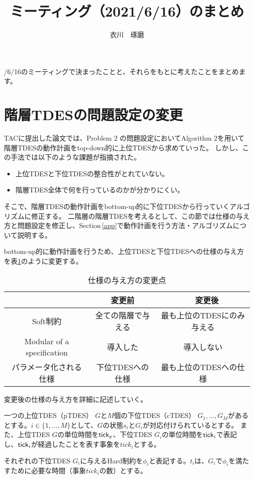 \documentclass[ 10pt]{jsarticle}
\title{ミーティング（2021/6/16）のまとめ}
\author{衣川　琢磨}
\newcommand{\rsec}[1]{Section\,\ref{#1}}
\newcommand{\tick}{{\sf tick}}
\begin{document}
/6/16のミーティングで決まったことと、それらをもとに考えたことをまとめます。

\section{階層TDESの問題設定の変更}
TACに提出した論文では、Problem 2 の問題設定においてAlgorithm 2を用いて階層TDESの動作計画をtop-down的に上位TDESから求めていった。
しかし、この手法では以下のような課題が指摘された。
\begin{itemize}
\item
上位TDESと下位TDESの整合性がとれていない。
\item
階層TDES全体で何を行っているのかが分かりにくい。
\end{itemize}
そこで、階層TDESの動作計画をbottom-up的に下位TDESから行っていくアルゴリズムに修正する。
二階層の階層TDESを考えるとして、この節では仕様の与え方と問題設定を修正し、\rsec{app}で動作計画を行う方法・アルゴリズムについて説明する。

bottom-up的に動作計画を行うため、上位TDESと下位TDESへの仕様の与え方を表\ref{spec}のように変更する。
%
\begin{table}[htb]
\centering
\caption{仕様の与え方の変更点}
\label{spec}
\begin{tabular}{c||c|c}
 &変更前　&　変更後　\\\hline\hline
Soft制約&全ての階層で与える&最も上位のTDESにのみ与える\\\hline
Modular of a specification&導入した&導入しない\\\hline
パラメータ化される仕様 &下位TDESへの仕様&最も上位のTDESへの仕様
\end{tabular}
\end{table}
%

変更後の仕様の与え方を詳細に記述していく。

一つの上位TDES（pTDES） $G$と$M$個の下位TDES（cTDES） $G_1,\ldots,G_M$があるとする。$i\in\{1,\ldots,M\}$として、$G$の状態$s_i$と$G_i$が対応付けられているとする。
また、上位TDES $G$の単位時間を$\tick_p$、下位TDES $G_i$の単位時間を$\tick_i$で表記し、$\tick_i$が経過したことを表す事象を$\textit{tick}_i$とする。

それぞれの下位TDES $G_i$に与えるHard制約を$\phi_i$と表記する。$t_i$は、$G_i$で$\phi_i$を満たすために必要な時間（事象$\textit{tick}_i$の数）とする。
\end{document}

